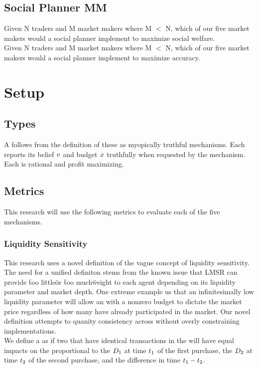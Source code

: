 \subsection{Social Planner MM}
Given N traders and M market makers where M $<$ N, which of our five market makers would
a social planner implement to maximize social welfare.\\

Given N traders and M market makers where M $<$ N, which of our five market makers would
a social planner implement to maximize accuracy.

\section{Setup}

\subsection{Types}
A  follows from the definition of these  as myopically truthful
mechanisms. Each  reports its belief $v$ and budget $x$
truthfully when requested by the mechanism. Each  is rational and profit
maximizing.

\subsection{Metrics}
This research will use the following metrics to evaluate each of the five mechanisms.
\subsubsection{Liquidity Sensitivity}
This research uses a novel definition of the vague concept of liquidity sensitivity. The need
for a unified definiton stems from the known issue that LMSR can provide \"too little\" or 
\"too much\" weight to each agent depending on its liquidity parameter and market depth. One extreme
example us that an infinitesimally low liquidity parameter will allow an  with a nonzero
budget to dictate the market price regardless of how many  have already participated in
the market. Our novel definition attempts to quanity consistency across  without
overly constraining implementations. \\

We define a  as  if two  that have identical
transactions in the  will have equal impacts on the  proportional to 
the  $D_{1}$ at time $t_{1}$ of the first purchase, the  
$D_{2}$ at time $t_{2}$ of the second purchase, and the difference in time $t_{1} - t_{2}$.\\

